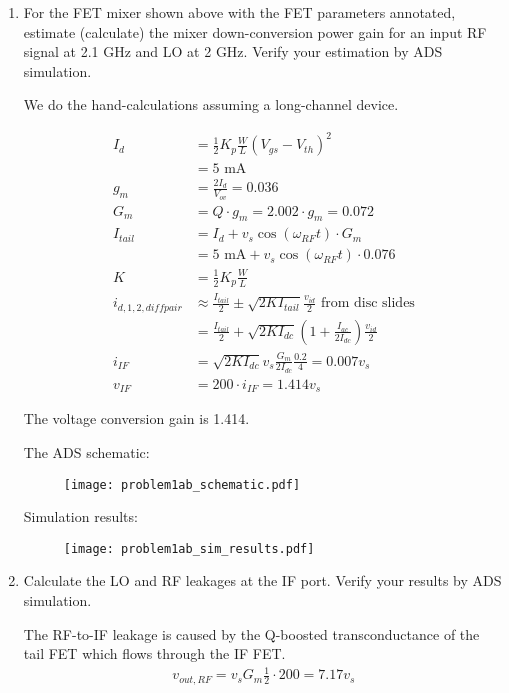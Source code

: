 \begin{enumerate}[label=(\alph*)]
    \item {\color{blue} For the FET mixer shown above with the FET parameters annotated, estimate (calculate) the mixer down-conversion power gain for an input RF signal at 2.1 GHz and LO at 2 GHz. Verify your estimation by ADS simulation.}

    We do the hand-calculations assuming a long-channel device.

    \begin{align*}
        I_d &= \frac{1}{2} K_p \frac{W}{L} (V_{gs} - V_{th})^2 \\
        &= 5 \text{ mA} \\
        g_m &= \frac{2 I_d}{V_{ov}} = 0.036 \\
        G_m &= Q \cdot g_m = 2.002 \cdot g_m = 0.072 \\
        I_{tail} &= I_d + v_s \cos(\omega_{RF} t) \cdot G_m \\
        &= 5 \text{ mA} + v_s \cos(\omega_{RF} t) \cdot 0.076 \\
        K &= \frac{1}{2} K_p \frac{W}{L} \\
        i_{d,1,2,diffpair} &\approx \frac{I_{tail}}{2} \pm \sqrt{2 K I_{tail}} \frac{v_{id}}{2} \text{ from disc slides} \\
        &= \frac{I_{tail}}{2} + \sqrt{2 K I_{dc}} (1 + \frac{I_{ac}}{2 I_{dc}}) \frac{v_{id}}{2} \\
        i_{IF} &= \sqrt{2 K I_{dc}} v_s \frac{G_m}{2 I_{dc}} \frac{0.2}{4} = 0.007 v_s \\
        v_{IF} &= 200 \cdot i_{IF} = 1.414 v_s
    \end{align*}

    The voltage conversion gain is 1.414.

    The ADS schematic:
    \begin{figure}[H]
        \centering \texttt{[image: problem1ab\_schematic.pdf]}
    \end{figure}

    Simulation results:
    \begin{figure}[H]
        \centering \texttt{[image: problem1ab\_sim\_results.pdf]}
    \end{figure}

    \item {\color{blue} Calculate the LO and RF leakages at the IF port. Verify your results by ADS simulation.}

    The RF-to-IF leakage is caused by the Q-boosted transconductance of the tail FET which flows through the IF FET.
    \begin{align*}
        v_{out,RF} = v_s G_m \frac{1}{2} \cdot 200 = 7.17 v_s
    \end{align*}


\end{enumerate}
